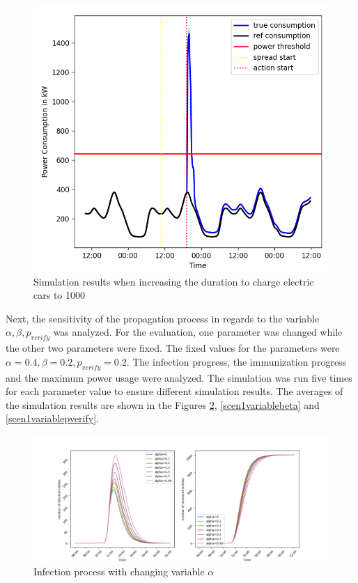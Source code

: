 \begin{figure}[!ht]
    \center
    \includegraphics[scale=.5]{figs/eval/scenario1/longev.png}
    \caption{Simulation results when increasing the duration to 
    charge electric cars to 1000}
    \label{firstscenariobasicevchange}
\end{figure}

Next, the sensitivity of the propagation process 
in regards to the variable $\alpha, \beta, p_{verify}$ 
was analyzed. For the evaluation, one parameter was changed
while the other two parameters were fixed.
The fixed values for the parameters were 
$\alpha=0.4, \beta=0.2, p_{verify}=0.2$. 
The infection progress, the immunization progress 
and the maximum power usage were analyzed.
The simulation was run five times for each parameter
value to ensure different simulation results. The 
averages of the simulation results are shown in the 
Figures \ref{scen1variablealpha},
\ref{scen1variablebeta} and \ref{scen1variablepverify}.


\begin{figure}[!ht]
    \centering
    \includegraphics[scale=.5]{figs/eval/scenario1/alpha_mix.png}
    \caption{Infection process with changing variable $\alpha$}
    \label{scen1variablealpha} 
\end{figure}

